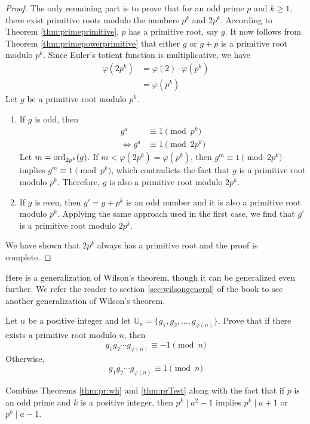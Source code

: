 \documentclass{subfile}
\begin{document}
\begin{proof}
		The only remaining part is to prove that for an odd prime $p$ and $k \geq 1$, there exist primitive roots modulo the numbers $p^k$ and $2p^k$. According to Theorem \ref{thm:primeprimitive}, $p$ has a primitive root, say $g$. It now follows from Theorem \ref{thm:primepowerprimitive} that either $g$ or $g+p$ is a primitive root modulo $p^k$. Since Euler's totient function is multiplicative, we have
			\begin{align*}
				\varphi(2p^k)
					& = \varphi(2)\cdot \varphi(p^k)\\
					& = \varphi(p^k)
			\end{align*}
		Let $g$ be a primitive root modulo $p^k$.
		\begin{enumerate}
			\item If $g$ is odd, then
			\begin{align*}
				g^a
					& \equiv 1 \pmod{p^k}\\
				\iff g^a
					& \equiv 1 \pmod{2p^k}
			\end{align*}
			Let $m = \operatorname{ord}_{2p^k}(g)$. If $m<\varphi(2p^k)=\varphi(p^k)$, then $g^m \equiv 1\pmod{2p^k}$ implies $g^m \equiv 1\pmod{p^k}$, which contradicts the fact that $g$ is a primitive root modulo $p^k$. Therefore, $g$ is also a primitive root modulo $2p^k$.
			\item If $g$ is even, then $g'=g+p^k$ is an odd number and it is also a primitive root modulo $p^k$. Applying the same approach used in the first case, we find that $g'$ is a primitive root modulo $2p^k$.
		\end{enumerate}
		We have shown that $2p^k$ always has a primitive root and the proof is complete.
	\end{proof}

Here is a generalization of Wilson's theorem, though it can be generalized even further. We refer the reader to section \eqref{sec:wilsongeneral} of the book to see another generalization of Wilson's theorem.
	\begin{problem}\label{thm:genWilson}
		Let $n$ be a positive integer and let $\mathbb U_n = \{g_1, g_2, \ldots, g_{\varphi(n)}\}$. Prove that if there exists a primitive root modulo $n$, then
		\[g_1g_2\cdots g_{\varphi(n)}\equiv-1\pmod n\]
		Otherwise,
		\[g_1g_2\cdots g_{\varphi(n)}\equiv1\pmod n\]
	\end{problem}

	\begin{hint}
		Combine Theorems \ref{thm:pr:wh} and \ref{thm:prTest} along with the fact that if $p$ is an odd prime and $k$ is a positive integer, then $p^k \mid a^2-1$ implies $p^k \mid a+1$ or $p^k\mid a-1$.
	\end{hint}
\end{document}
